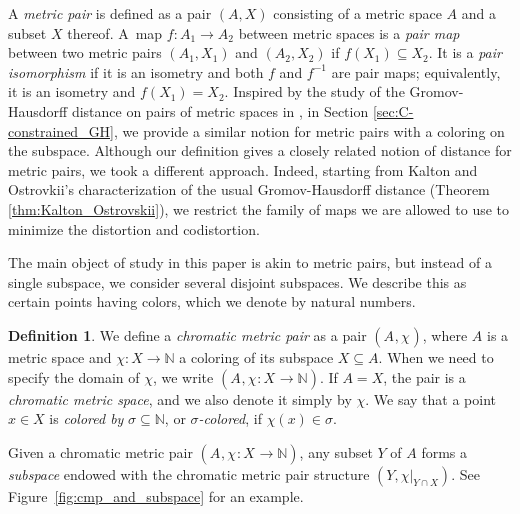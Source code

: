 \documentclass[8pt,a4paper,oneside,english,english]{article}
\theoremstyle{plain}
\theoremstyle
{plain}
\theoremstyle{definition}
\newtheorem{definition}[theorem]{Definition}%
\newcommand{\N}{\mathbb{N}}
\newcommand{\MP}[1]{(A_{#1},\chi_{#1})}
\newcommand{\extMP}[1]{(A_{#1},\chi_{#1}\colon X_{#1}\to\N)}
\begin{document}
A {\em metric pair} is defined as a pair $(A,X)$ consisting of a metric space $A$ and a subset $X$ thereof. A~map $f\colon A_1\to A_2$ between metric spaces is a {\em pair map} between two metric pairs $(A_1,X_1)$ and $(A_2,X_2)$ if $f(X_1)\subseteq X_2$. It is a \emph{pair isomorphism} if it is an isometry and both $f$ and $f^{-1}$ are pair maps; equivalently, it is an isometry and $f(X_1) = X_2$. 
Inspired by the study of the Gromov-Hausdorff distance on pairs of metric spaces in \cite{GomChe}, in Section \ref{sec:C-constrained_GH}, we provide a similar notion for metric pairs with a coloring on the subspace. Although our definition gives a closely related notion of distance for metric pairs, we took a different approach.
Indeed, starting from Kalton and Ostrovkii's characterization of the usual Gromov-Hausdorff distance (Theorem \ref{thm:Kalton_Ostrovskii}), we restrict the family of maps we are allowed to use to minimize the distortion and codistortion.

The main object of study in this paper is akin to metric pairs, but instead of a single subspace, we consider several disjoint subspaces. We describe this as certain points having colors, which we denote by natural numbers.

\begin{definition}\label{def:chromatic-metric-pair}
    We define a \emph{chromatic metric pair} as a pair $\MP{}$, where $A$ is a metric space and $\chi\colon X\rightarrow \N$ a coloring of its 
    subspace $X\subseteq A$.
    When we need to specify the domain of $\chi$, we write $\extMP{}$. If $A=X$, the pair is a {\em chromatic metric space}, and we also denote it simply by $\chi$.
    We say that a point $x\in X$ is \emph{colored by} $\sigma\subseteq\N$, or \emph{$\sigma$-colored}, if $\chi(x)\in\sigma$.
\end{definition}

Given a chromatic metric pair $\extMP{}$, any subset $Y$ of $A$ forms a \emph{subspace} endowed with the chromatic metric pair structure $(Y,\chi|_{Y\cap X})$. See Figure~\ref{fig:cmp_and_subspace} for an example.
\end{document}
